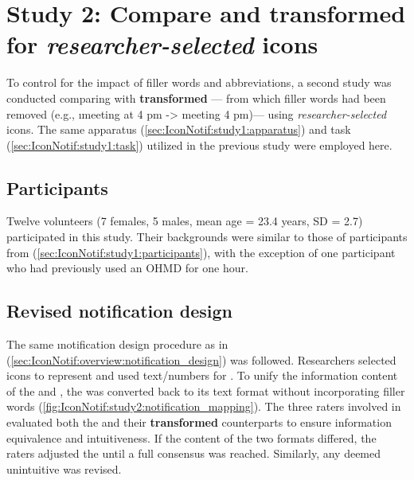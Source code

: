 \section{Study 2: Compare  and transformed  for \textit{researcher-selected} icons}
\label{sec:IconNotif:study2}

To control for the impact of filler words and abbreviations, a second study was conducted comparing  with \textbf{transformed} --- from which filler words had been removed (e.g., \i{meeting at 4 pm  -> meeting  4 pm})--- using \textit{researcher-selected} icons. The same apparatus (\autoref{sec:IconNotif:study1:apparatus}) and task (\autoref{sec:IconNotif:study1:task}) utilized in the previous study were employed here.

\subsection{Participants}
\label{sec:IconNotif:study2:participants}

Twelve volunteers (7 females, 5 males, mean age = 23.4 years, SD = 2.7) participated in this study. Their backgrounds were similar to those of participants from \studyone{} (\autoref{sec:IconNotif:study1:participants}), with the exception of one participant who had previously used an OHMD for one hour.

\subsection{Revised notification design}
\label{sec:IconNotif:study2:notification_design}

The same \i{notification design} procedure as in \studyone{} (\autoref{sec:IconNotif:overview:notification_design}) was followed. Researchers selected icons to represent \primaryinfo{} and used text/numbers for \secondaryinfo{}. To unify the information content of the \iconnotif{} and \textnotif{}, the \iconnotif{} was converted back to its text format without incorporating filler words (\autoref{fig:IconNotif:study2:notification_mapping}). The three raters involved in \studyone{} evaluated both the \iconnotif{} and their \textbf{transformed} \textnotif{} counterparts to ensure information equivalence and intuitiveness. If the content of the two formats differed, the raters adjusted the \textnotif{} until a full consensus was reached. Similarly, any \iconnotif{} deemed unintuitive was revised.


